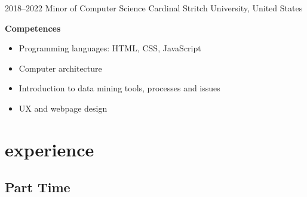 \documentclass[]{friggeri-cv-a4}
\begin{document}
\begin{entrylist}
\entry
{2018--2022}
{Minor {\normalfont of Computer Science}}
{Cardinal Stritch University, United States}
{\textbf{Competences}
\begin{itemize}
    \item Programming languages: HTML, CSS, JavaScript
    \item Computer architecture
    \item Introduction to data mining tools, processes and issues
    \item UX and webpage design
\end{itemize}}

\end{entrylist}


\section{experience}

\subsection{Part Time}
\end{document}
